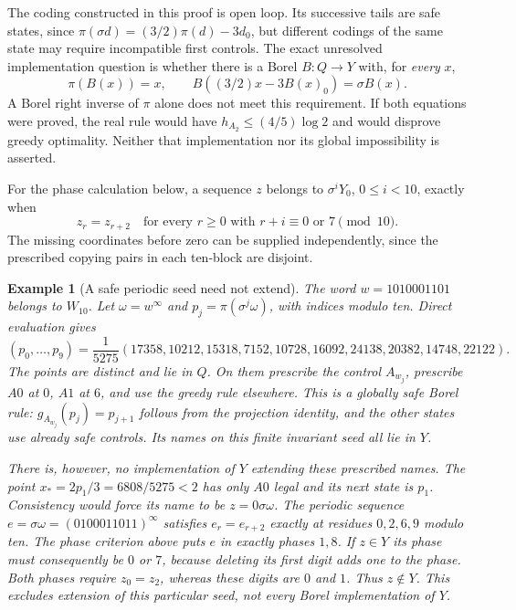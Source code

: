 \documentclass[11pt,reqno]{amsart}
\numberwithin{equation}{section}
\newtheorem{example}[theorem]{Example}
\theoremstyle{definition}
\begin{document}
The coding constructed in this proof is open loop. Its successive
tails are safe states, since
$\pi(\sigma d)=(3/2)\pi(d)-3d_0$, but different codings
of the same state may require incompatible first controls.
The exact unresolved implementation question is whether there is
a Borel $B:Q\to Y$ with, for \emph{every} $x$,
\begin{equation}\label{eq:implementation}
 \pi(B(x))=x,\qquad
 B((3/2)x-3B(x)_0)=\sigma B(x).
\end{equation}
A Borel right inverse of $\pi$ alone does not meet this requirement.
If both equations were proved, the real rule would have
$h_{A_2}\le(4/5)\log2$ and would disprove greedy optimality.
Neither that implementation nor its global impossibility is asserted.


For the phase calculation below, a sequence $z$ belongs to
$\sigma^iY_0$, $0\le i<10$, exactly when
\[
 z_r=z_{r+2}\quad\text{for every }r\ge0
 \text{ with }r+i\equiv0\text{ or }7\pmod {10}.
\]
The missing coordinates before zero can be supplied independently,
since the prescribed copying pairs in each ten-block are disjoint.

\begin{example}[A safe periodic seed need not extend]
\label{ex:periodic-seed}
The word $w=1010001101$ belongs to $W_{10}$. Let
$\omega=w^\infty$ and $p_j=\pi(\sigma^j\omega)$, with indices
modulo ten. Direct evaluation gives
\[
 (p_0,\ldots,p_9)=\frac1{5275}
 (17358,10212,15318,7152,10728,16092,24138,20382,14748,22122).
\]
The points are distinct and lie in $Q$. On them prescribe the
control $A_{w_j}$, prescribe $A0$ at $0$, $A1$ at $6$, and use
the greedy rule elsewhere. This is a globally safe Borel rule:
$g_{A_{w_j}}(p_j)=p_{j+1}$ follows from the projection identity,
and the other states use already safe controls. Its names on
this finite invariant seed all lie in $Y$.

There is, however, no implementation of $Y$ extending these
prescribed names. The point
$x_*=2p_1/3=6808/5275<2$ has only $A0$ legal and its next
state is $p_1$. Consistency would force its name to be
$z=0\sigma\omega$. The periodic sequence
$e=\sigma\omega=(0100011011)^\infty$ satisfies
$e_r=e_{r+2}$ exactly at residues $0,2,6,9$ modulo ten.
The phase criterion above puts $e$ in exactly phases $1,8$.
If $z\in Y$ its phase must consequently be $0$ or $7$, because
deleting its first digit adds one to the phase. Both phases require
$z_0=z_2$, whereas these digits are $0$ and $1$.
Thus $z\notin Y$. This excludes extension of this particular
seed, not every Borel implementation of $Y$.
\end{example}
\end{document}
